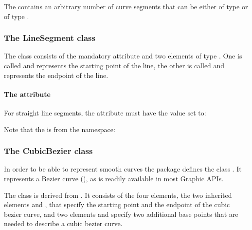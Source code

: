 The  contains an arbitrary number of curve 
segments that can be either of type \LineSegment or of type 
\CubicBezier. 


\subsubsection{The LineSegment class} 
\label{linesegment-class} 

The \LineSegment class consists of the mandatory attribute 
 and two elements of type \Point. One is called 
 and represents the starting point of the line, the other 
is called  and represents the endpoint of the line. 

\paragraph {The  attribute} For straight line segments, 
the attribute  must have the value set to: 

\begin{center}
\end{center}

Note that the  is from the  namespace: 

\begin{center}
\end{center}

\subsubsection{The CubicBezier class}
\label{cubicbezier-class}
In order to be able to represent smooth curves the \Layout package defines the class \CubicBezier. It represents a Bezier curve (\cite{beziercurve}), as is readily available in most Graphic APIs. 

The class \CubicBezier is derived from \LineSegment. It consists of 
the four elements, the two inherited elements  and , that specify the starting point and the endpoint of the cubic bezier curve, and two elements  and  specify two additional base points that are needed to describe a cubic bezier curve. 


